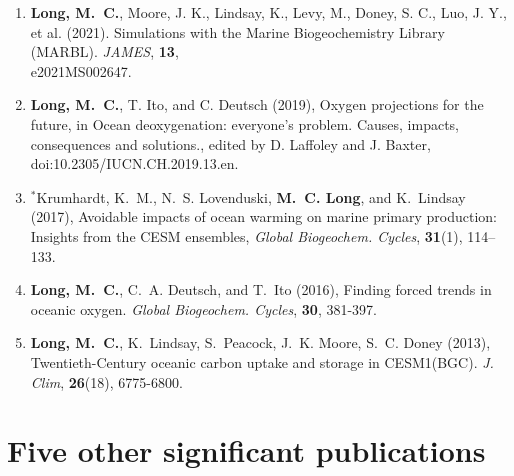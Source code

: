 \documentclass[12pt]{article}
\begin{document}
\begin{enumerate}[leftmargin=1.5em,font=\normalfont]
\setlength{\itemsep}{-0.3em}

\item
\textbf{{Long}, M.~C.}, Moore, J. K., Lindsay, K., Levy, M., Doney, S. C., Luo, J. Y., et al. (2021). Simulations with the Marine Biogeochemistry Library (MARBL). \textit{JAMES}, \textbf{13}, \\e2021MS002647.

\item
\textbf{{Long}, M.~C.}, T. Ito, and C. Deutsch (2019), Oxygen projections for the future, in Ocean deoxygenation:
everyone’s problem. Causes, impacts, consequences and solutions., edited by D. Laffoley and J. Baxter, doi:10.2305/IUCN.CH.2019.13.en.

\item
$^*${Krumhardt}, K.~M., N.~S. Lovenduski, \textbf{M.~C. Long}, and K.~Lindsay (2017),
  Avoidable impacts of ocean warming on marine primary production: Insights
  from the CESM ensembles, \textit{Global Biogeochem. Cycles},
  \textbf{31}(1), 114--133.

\item
\textbf{{Long}, M.~C.}, C.~A. {Deutsch}, and T.~Ito (2016), Finding forced trends in oceanic oxygen. \textit{Global Biogeochem. Cycles}, \textbf{30}, 381-397.

\item
\textbf{Long, M.~C.}, K.~Lindsay, S.~Peacock, J.~K. Moore, S.~C. Doney (2013), {Twentieth-Century oceanic carbon uptake and storage in CESM1(BGC)}. \textit{J. Clim}, \textbf{26}(18), 6775-6800.

\end{enumerate}


\section{Five other significant publications}
\end{document}
